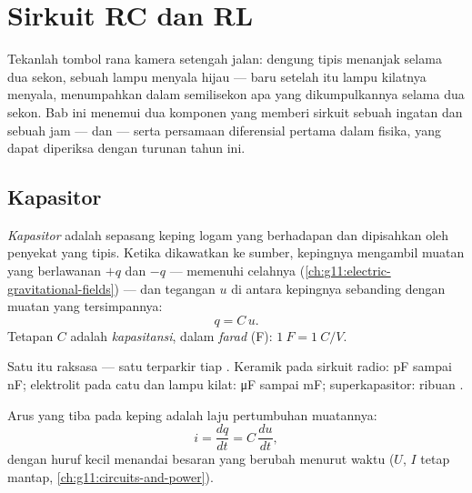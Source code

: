 \chapter{Sirkuit RC dan RL}\label{ch:g12:rc-rl-circuits}

Tekanlah tombol rana kamera setengah jalan: dengung tipis menanjak selama dua
sekon, sebuah lampu menyala hijau --- baru setelah itu lampu kilatnya menyala,
menumpahkan dalam semilisekon apa yang dikumpulkannya selama dua sekon. Bab ini
menemui dua komponen yang memberi sirkuit sebuah ingatan dan sebuah jam ---
 dan  --- serta persamaan diferensial pertama dalam fisika,
yang dapat diperiksa dengan turunan tahun ini.

\section{Kapasitor}

\begin{definition}\label{def:g12:rc-rl-circuits:capacitor}
\emph{Kapasitor} adalah sepasang keping logam yang berhadapan
dan dipisahkan oleh penyekat yang tipis. Ketika dikawatkan ke sumber, kepingnya
mengambil muatan yang berlawanan $+q$ dan $-q$ ---  memenuhi celahnya
(\cref{ch:g11:electric-gravitational-fields}) --- dan tegangan $u$
di antara kepingnya sebanding dengan muatan yang tersimpannya:
\[ q = C\,u . \]
Tetapan $C$ adalah \emph{kapasitansi}, dalam
\emph{farad} (\unit{F}): $\qty{1}{F} = \qty{1}{C/V}$.
\end{definition}

\begin{example}\label{ex:g12:rc-rl-circuits:orders}
Satu  itu raksasa --- satu  terparkir tiap . Keramik pada sirkuit
radio: \unit{pF} sampai \unit{nF}; elektrolit pada catu  dan
lampu kilat: \unit{\micro F} sampai \unit{mF}; superkapasitor: ribuan .
\end{example}

\begin{proposition}\label{prop:g12:rc-rl-circuits:cdudt}
Arus yang tiba pada keping  adalah laju pertumbuhan
muatannya:
\[
i = \frac{dq}{dt} = C\,\frac{du}{dt} ,
\]
dengan huruf kecil menandai besaran yang berubah menurut waktu ($U$, $I$ tetap mantap,
\cref{ch:g11:circuits-and-power}).
\end{proposition}

